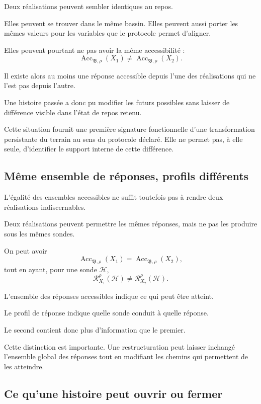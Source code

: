 Deux réalisations peuvent sembler identiques au repos.

Elles peuvent se trouver dans le même bassin. Elles peuvent aussi porter les mêmes valeurs pour les variables que le protocole permet d'aligner.

Elles peuvent pourtant ne pas avoir la même accessibilité :
\[
\operatorname{Acc}_{\mathfrak B,\rho}(X_1)
\neq
\operatorname{Acc}_{\mathfrak B,\rho}(X_2).
\]

Il existe alors au moins une réponse accessible depuis l'une des réalisations qui ne l'est pas depuis l'autre.

Une histoire passée a donc pu modifier les futurs possibles sans laisser de différence visible dans l'état de repos retenu.

Cette situation fournit une première signature fonctionnelle d'une transformation persistante du terrain au sens du protocole déclaré. Elle ne permet pas, à elle seule, d'identifier le support interne de cette différence.

\subsection{Même ensemble de réponses, profils différents}

L'égalité des ensembles accessibles ne suffit toutefois pas à rendre deux réalisations indiscernables.

Deux réalisations peuvent permettre les mêmes réponses, mais ne pas les produire sous les mêmes sondes.

On peut avoir
\[
\operatorname{Acc}_{\mathfrak B,\rho}(X_1)
=
\operatorname{Acc}_{\mathfrak B,\rho}(X_2),
\]
tout en ayant, pour une sonde $\mathcal H$,
\[
\mathcal R_{X_1}^\rho(\mathcal H)
\neq
\mathcal R_{X_2}^\rho(\mathcal H).
\]

L'ensemble des réponses accessibles indique ce qui peut être atteint.

Le profil de réponse indique quelle sonde conduit à quelle réponse.

Le second contient donc plus d'information que le premier.

Cette distinction est importante. Une restructuration peut laisser inchangé l'ensemble global des réponses tout en modifiant les chemins qui permettent de les atteindre.

\subsection{Ce qu'une histoire peut ouvrir ou fermer}

